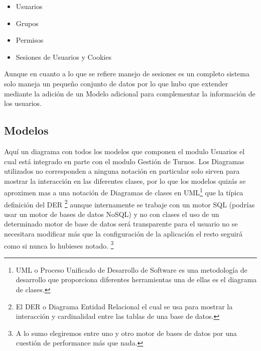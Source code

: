 \begin{itemize}
    \item Usuarios
    \item Grupos
    \item Permisos
    \item Sesiones de Usuarios y Cookies
\end{itemize}

Aunque en cuanto a lo que se refiere manejo de sesiones es un completo sistema solo maneja un pequeño conjunto de datos por lo que hubo que extender mediante la adición de un Modelo adicional para complementar la información de los usuarios.


\subsection{Modelos}

Aquí un diagrama con todos los modelos que componen el modulo Usuarios el cual está integrado en parte con el modulo Gestión de Turnos. Los Diagramas utilizados no corresponden a ninguna notación en particular solo sirven para mostrar la interacción en las diferentes clases, por lo que los modelos quizás se aproximen mas a una notación de Diagramas de clases en UML\footnote{UML o Proceso Unificado de Desarrollo de Software es una metodología de desarrollo que proporciona diferentes herramientas una de ellas es el diagrama de clases.} que la típica definición del DER \footnote{El DER o Diagrama Entidad Relacional el cual se usa para mostrar la interacción y cardinalidad entre las tablas de una base de datos.} aunque internamente se trabaje con un motor SQL (podrías usar un motor de bases de datos NoSQL)  y no con clases el uso de un determinado motor de base de datos será transparente para el usuario no se necesitara modificar más que la configuración de la aplicación el resto seguirá como si nunca lo hubieses notado. \footnote{A lo sumo elegiremos entre uno y otro motor de bases de datos por una cuestión de performance más que nada.}

